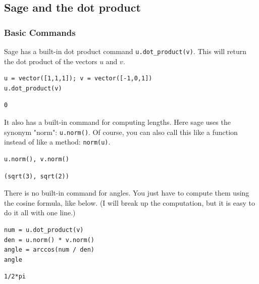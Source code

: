 \documentclass[10pt,]{book}
\theoremstyle{plain}
\theoremstyle{definition}
\numberwithin{equation}{section}
\begin{document}
\subsection[Sage and the dot product]{Sage and the dot product}\label{subsection-8}
\typeout{************************************************}
\typeout{************************************************}
\subsubsection[Basic Commands]{Basic Commands}\label{subsubsection-2}

      Sage has a built-in dot product command \verb?u.dot_product(v)?. This
      will return the dot product of the vectors \(u\) and \(v\).
\begin{lstlisting}[style=sageinput]
u = vector([1,1,1]); v = vector([-1,0,1])
u.dot_product(v)
\end{lstlisting}
\begin{lstlisting}[style=sageoutput]
0
\end{lstlisting}
\par

      It also has a built-in command for computing lengths. Here sage uses the
      synonym "norm": \verb?u.norm()?. Of course, you can also call this like
      a function instead of like a method: \verb?norm(u)?.
\begin{lstlisting}[style=sageinput]
u.norm(), v.norm()
\end{lstlisting}
\begin{lstlisting}[style=sageoutput]
(sqrt(3), sqrt(2))
\end{lstlisting}
\par

      There is no built-in command for angles. You just have to compute them
      using the cosine formula, like below. (I will break up the computation,
      but it is easy to do it all with one line.)
\begin{lstlisting}[style=sageinput]
num = u.dot_product(v)
den = u.norm() * v.norm()
angle = arccos(num / den)
angle
\end{lstlisting}
\begin{lstlisting}[style=sageoutput]
1/2*pi
\end{lstlisting}
\par
\end{document}

